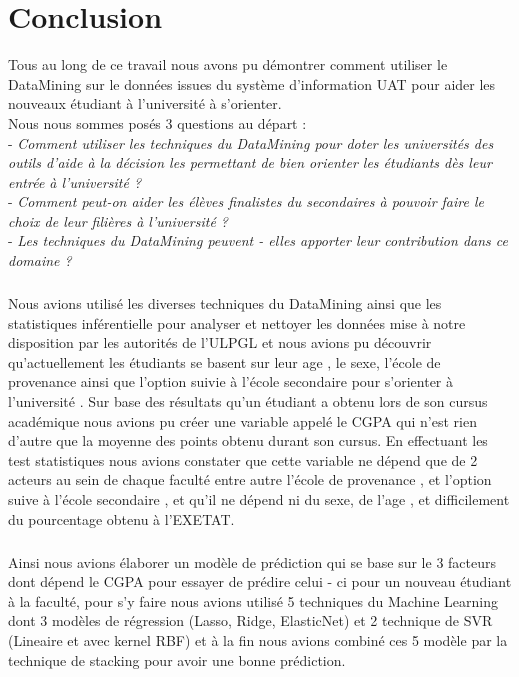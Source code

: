 \chapter*{Conclusion}
Tous au long de ce travail nous avons pu démontrer comment utiliser le DataMining sur le données issues du système d'information \ac{UAT} pour aider les nouveaux étudiant à l'université à s'orienter.\\
Nous nous sommes posés 3 questions au départ : \\
- \emph{Comment utiliser les techniques  du DataMining pour doter les universités des outils d'aide à la décision les permettant de bien orienter les étudiants dès leur entrée à l'université ?  }\\
- \emph{Comment peut-on aider les élèves finalistes du secondaires  à pouvoir faire le choix de leur filières à l'université ? }\\
- \emph{Les techniques du DataMining peuvent - elles apporter leur contribution dans ce domaine ? }
\paragraph{}
Nous avions utilisé les diverses techniques du DataMining ainsi que les statistiques inférentielle pour analyser  et nettoyer les données mise à notre disposition par les autorités de l'\ac{ULPGL} et nous avions pu découvrir qu'actuellement les étudiants se basent sur leur age , le sexe, l'école de provenance ainsi que l'option suivie à l'école secondaire pour s'orienter à l'université .
Sur base des résultats qu'un étudiant a obtenu lors de son cursus académique nous avions pu créer une variable appelé le \ac{CGPA}  qui  n'est rien d'autre que la moyenne des points obtenu durant son cursus. 
En effectuant les test statistiques nous avions constater que cette variable ne dépend  que de 2 acteurs au sein de chaque faculté entre autre l'école de provenance , et l'option suive à l'école secondaire , et qu'il ne dépend ni du sexe, de l'age , et difficilement du pourcentage obtenu à l'\ac{EXETAT}.
\paragraph{}
Ainsi nous avions élaborer un modèle de prédiction   qui se base sur le 3 facteurs dont dépend le CGPA pour essayer de prédire celui - ci pour un nouveau étudiant à la faculté, pour s'y faire nous avions utilisé 5 techniques du Machine Learning dont 3 modèles de régression (Lasso, Ridge, ElasticNet) et 2 technique de \ac{SVR} (Lineaire et avec kernel RBF)  et à la fin nous avions combiné ces 5 modèle par la technique de stacking pour avoir une bonne prédiction.

